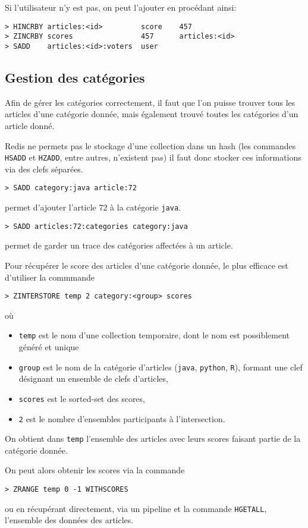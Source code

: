 \documentclass[article,a4paper,12pt]{article}
\begin{document}
Si l'utilisateur n'y est pas, on peut l'ajouter en procédant ainsi:


\begin{verbatim}
> HINCRBY articles:<id>         score    457
> ZINCRBY scores                457      articles:<id>
> SADD    articles:<id>:voters  user
\end{verbatim}


\subsection{Gestion des catégories}
\label{sec:orgheadline10}

Afin de gérer les catégories correctement, il faut que l'on puisse trouver
tous les articles d'une catégorie donnée, mais également trouvé toutes les
catégories d'un article donné.

Redis ne permets pas le stockage d'une collection dans un hash (les commandes
\texttt{HSADD} et \texttt{HZADD}, entre autres, n'existent pas) il faut donc stocker ces
informations via des clefs séparées.

\begin{verbatim}
> SADD category:java article:72
\end{verbatim}
permet d'ajouter l'article 72 à la catégorie \texttt{java}.

\begin{verbatim}
> SADD articles:72:categories category:java
\end{verbatim}
permet de garder un trace des catégories affectées à un article.

Pour récupérer le score des articles d'une catégorie donnée, le plus efficace
est d'utiliser la commmande
\begin{verbatim}
> ZINTERSTORE temp 2 category:<group> scores
\end{verbatim}
où
\begin{itemize}
\item \texttt{temp} est le nom d'une collection temporaire, dont le nom est possiblement
généré et unique
\item \texttt{group} est le nom de la catégorie d'articles (\texttt{java}, \texttt{python}, \texttt{R}),
formant une clef désignant un ensemble de clefs d'articles,
\item \texttt{scores} est le sorted-set des scores,
\item \texttt{2} est le nombre d'ensembles participants à l'intersection.
\end{itemize}

On obtient dans \texttt{temp} l'ensemble des articles avec leurs scores faisant
partie de la catégorie donnée.

On peut alors obtenir les scores via la commande
\begin{verbatim}
> ZRANGE temp 0 -1 WITHSCORES
\end{verbatim}

ou en récupérant directement, via un pipeline et la commande \texttt{HGETALL},
l'ensemble des données des articles.
\end{document}
